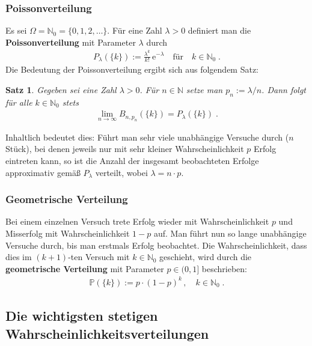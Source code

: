 \documentclass[ngerman,draft,parskip=half,twoside]{scrartcl}
\newtheorem{thm}{Satz}[section]
\newcommand*{\N}{\mathbb{N}}      %
\newcommand*{\WKM}{\mathbb{P}}      %
\begin{document}
\subsubsection{Poissonverteilung}
Es sei $\Omega=\N_0=\{0,1,2,\ldots\}$. Für eine Zahl $\lambda>0$ definiert
man die \textbf{Poissonverteilung} mit Parameter $\lambda$ durch
\begin{gather*}
  P_\lambda(\{k\}):= \frac{\lambda^k}{k !}\,\mathrm e^{-\lambda}\quad\mbox{für}\quad k\in\N_0\;.
\end{gather*}
Die Bedeutung der Poissonverteilung ergibt sich aus folgendem Satz:
\begin{thm}
Gegeben sei eine Zahl $\lambda>0$. Für $n\in\N$ setze man
$p_n:=\lambda/n$. Dann folgt für alle $k\in\N_0$
stets
  \begin{gather*}
    \lim_{n\to\infty} B_{n,p_n}(\{k\})= P_\lambda(\{k\})\;.
  \end{gather*}
\end{thm}
Inhaltlich bedeutet dies: Führt man sehr viele unabhängige Versuche durch ($n$ Stück), bei denen jeweils
nur mit sehr kleiner
Wahrscheinlichkeit $p$ Erfolg eintreten kann, so ist die Anzahl der insgesamt beobachteten Erfolge
approximativ gemäß $P_\lambda$ verteilt, wobei $\lambda= n\cdot p$.
\subsubsection{Geometrische Verteilung}
Bei einem einzelnen Versuch trete Erfolg wieder mit Wahrscheinlichkeit $p$ und Misserfolg
mit Wahrscheinlichkeit $1-p$ auf. Man führt nun so lange unabhängige Versuche durch, bis
man erstmals Erfolg beobachtet. Die Wahrscheinlichkeit, dass dies im $(k+1)$-ten Versuch mit
$k\in\N_0$ geschieht, wird durch die \textbf{geometrische Verteilung} mit Parameter $p\in(0,1]$
beschrieben:
\begin{gather*}
  \WKM(\{k\}):= p\cdot(1-p)^k\,,\quad k\in\N_0\;.
\end{gather*}
\subsection{Die wichtigsten stetigen Wahrscheinlichkeitsverteilungen}
\end{document}
